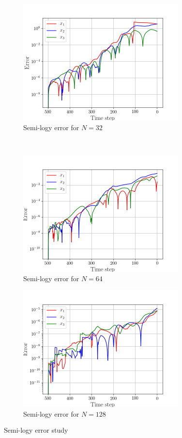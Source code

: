 \begin{figure}[H]
    \begin{subfigure}[H]{0.45\textwidth}
        \includegraphics[height=2.5in]{media/rk4/run-32/error-32-log.png}
        \caption{Semi-logy error for $N=32$}
        \label{fig:error-32-semilogy}
    \end{subfigure}
    ~
    \begin{subfigure}[H]{0.45\textwidth}
        \includegraphics[height=2.5in]{media/rk4/run-64/error-64-log.png}
        \caption{Semi-logy error for $N=64$}
        \label{fig:error-64-semilogy}
    \end{subfigure}
    \begin{subfigure}[H]{0.45\textwidth}
        \includegraphics[height=2.5in]{media/rk4/run-128/error-128-log.png}
        \caption{Semi-logy error for $N=128$}
        \label{fig:error-128-semilogy}
    \end{subfigure}
    \caption{Semi-logy error study}
\end{figure}

